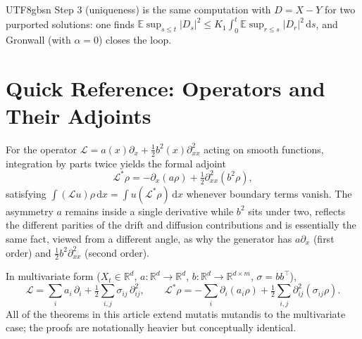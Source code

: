 \documentclass{article}
\begin{document}
\begin{CJK*}{UTF8}{gbsn}
Step 3 (uniqueness) is the same computation with $D=X-Y$ for two purported solutions: one finds $\mathbb{E}\sup_{s\le t}|D_s|^2\le K_1\!\int_0^t\mathbb{E}\sup_{r\le s}|D_r|^2\,\mathrm{d}s$, and Gronwall (with $\alpha=0$) closes the loop.

\section{Quick Reference: Operators and Their Adjoints\label{app:adjoint}}

For the operator $\mathcal{L}=a(x)\partial_x+\tfrac{1}{2}b^2(x)\partial_{xx}^2$ acting on smooth functions, integration by parts twice yields the formal adjoint
\[
  \mathcal{L}^*\rho=-\partial_x(a\rho)+\tfrac{1}{2}\partial_{xx}^2(b^2\rho),
\]
satisfying $\int(\mathcal{L}u)\rho\,\mathrm{d}x=\int u(\mathcal{L}^*\rho)\,\mathrm{d}x$ whenever boundary terms vanish. The asymmetry $a$ remains inside a single derivative while $b^2$ sits under two, reflects the different parities of the drift and diffusion contributions and is essentially the same fact, viewed from a different angle, as why the generator has $a\partial_x$ (first order) and $\tfrac{1}{2}b^2\partial_{xx}^2$ (second order).

In multivariate form ($X_t\in\mathbb{R}^d$, $a:\mathbb{R}^d\to\mathbb{R}^d$, $b:\mathbb{R}^d\to\mathbb{R}^{d\times m}$, $\sigma=bb^\top$),
\[
  \mathcal{L}=\sum_i a_i\,\partial_i+\tfrac{1}{2}\sum_{i,j}\sigma_{ij}\,\partial_{ij}^2,\qquad
  \mathcal{L}^*\rho=-\sum_i\partial_i(a_i\rho)+\tfrac{1}{2}\sum_{i,j}\partial_{ij}^2(\sigma_{ij}\rho).
\]
All of the theorems in this article extend mutatis mutandis to the multivariate case; the proofs are notationally heavier but conceptually identical.

\end{CJK*}
\end{document}
